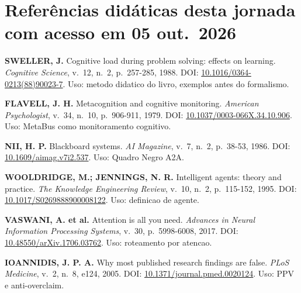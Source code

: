 \section{Refer\^encias did\'aticas desta jornada com acesso em 05 out.~2026}

\begin{referencia}
\textbf{SWELLER, J.} Cognitive load during problem solving: effects on learning. \emph{Cognitive Science}, v.~12, n.~2, p.~257-285, 1988. DOI: \href{https://doi.org/10.1016/0364-0213(88)90023-7}{10.1016/0364-0213(88)90023-7}. Uso: metodo didatico do livro, exemplos antes do formalismo.
\end{referencia}

\begin{referencia}
\textbf{FLAVELL, J. H.} Metacognition and cognitive monitoring. \emph{American Psychologist}, v.~34, n.~10, p.~906-911, 1979. DOI: \href{https://doi.org/10.1037/0003-066X.34.10.906}{10.1037/0003-066X.34.10.906}. Uso: MetaBus como monitoramento cognitivo.
\end{referencia}

\begin{referencia}
\textbf{NII, H. P.} Blackboard systems. \emph{AI Magazine}, v.~7, n.~2, p.~38-53, 1986. DOI: \href{https://doi.org/10.1609/aimag.v7i2.537}{10.1609/aimag.v7i2.537}. Uso: Quadro Negro A2A.
\end{referencia}

\begin{referencia}
\textbf{WOOLDRIDGE, M.; JENNINGS, N. R.} Intelligent agents: theory and practice. \emph{The Knowledge Engineering Review}, v.~10, n.~2, p.~115-152, 1995. DOI: \href{https://doi.org/10.1017/S0269888900008122}{10.1017/S0269888900008122}. Uso: definicao de agente.
\end{referencia}

\begin{referencia}
\textbf{VASWANI, A. et al.} Attention is all you need. \emph{Advances in Neural Information Processing Systems}, v.~30, p.~5998-6008, 2017. DOI: \href{https://doi.org/10.48550/arXiv.1706.03762}{10.48550/arXiv.1706.03762}. Uso: roteamento por atencao.
\end{referencia}

\begin{referencia}
\textbf{IOANNIDIS, J. P. A.} Why most published research findings are false. \emph{PLoS Medicine}, v.~2, n.~8, e124, 2005. DOI: \href{https://doi.org/10.1371/journal.pmed.0020124}{10.1371/journal.pmed.0020124}. Uso: PPV e anti-overclaim.
\end{referencia}

